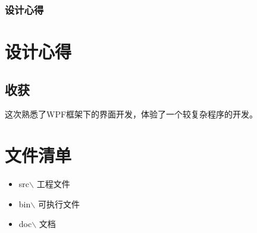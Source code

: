 \documentclass{beamer}
\begin{document}
\begin{frame}
\frametitle{设计心得}
\section{设计心得}
\subsection{收获}
这次熟悉了WPF框架下的界面开发，体验了一个较复杂程序的开发。
\section{文件清单}
\begin{itemize}
\item src$\backslash$ 工程文件
\item bin$\backslash$ 可执行文件
\item doc$\backslash$ 文档
\end{itemize}
\end{frame}
\end{document}
